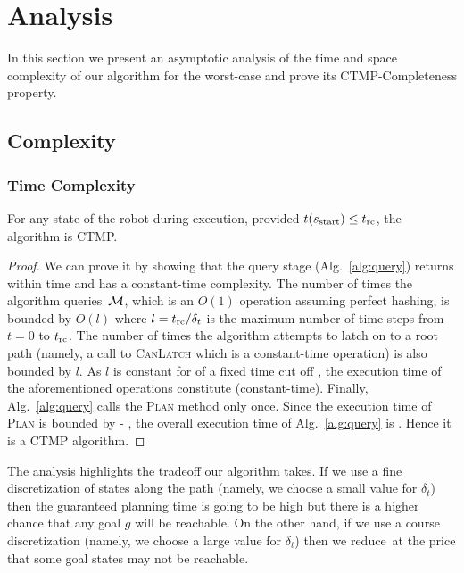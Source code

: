 \documentclass[a4paper]{report}
\begin{document}
\section{Analysis}
In this section we present an asymptotic analysis of the time and space complexity of our algorithm for the worst-case and prove its CTMP-Completeness property.

\subsection{Complexity}
\subsubsection{Time Complexity}
\label{sec:correct_conveyor}
\begin{lemma}
\label{lemma:bounded_time}
For any state \Sstart of the robot during execution, provided $t(s_{\textrm{start}}) \leq t_{\textrm{rc}}$, the algorithm is CTMP.
\end{lemma}

\begin{proof}
    We can prove it by showing that the query stage (Alg.~\ref{alg:query}) returns within \Tbound time and has a constant-time complexity.
    The number of times the algorithm queries~$\mathcal{M}$, which is an $O(1)$ operation assuming perfect hashing, is bounded by $O(l)$ where $l=t_{\textrm{rc}}/\delta_t$ is the maximum number of time steps from $t = 0$ to $t_{\textrm{rc}}$. 
    The number of times the algorithm attempts to latch on to a root path (namely, a call to \textsc{CanLatch}  which is a constant-time operation) is also bounded by $l$. 
    As $l$ is constant for of a fixed time cut off \Trc,  the execution time of the aforementioned operations constitute \Tconst (constant-time).
    Finally, Alg.~\ref{alg:query} calls the \textsc{Plan} method only once.
    Since the execution time of \textsc{Plan} is bounded by \Tbound - \Tconst, the overall execution time of Alg.~\ref{alg:query} is \Tbound. Hence it is a CTMP algorithm.
\end{proof}

The analysis highlights the tradeoff our algorithm takes.
If we use a fine discretization of states along the path (namely, we choose a small value for $\delta_t$) then the guaranteed  planning time \Tbound is going to be high but there is a higher chance that any goal $g$ will be reachable.
On the other hand, if we use a course discretization (namely, we choose a large value for $\delta_t$) then we reduce~\Tbound at the price that some goal states may not be reachable.
\end{document}
